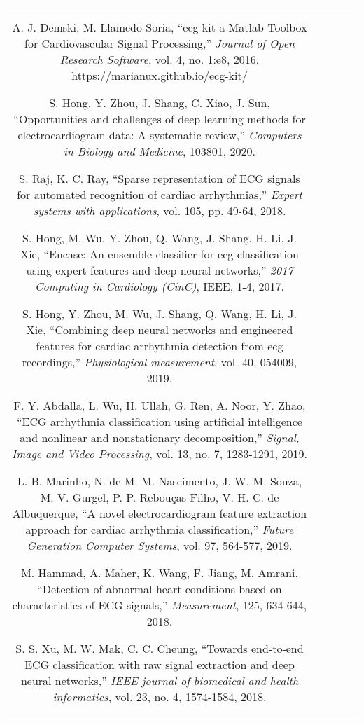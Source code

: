 \documentclass[submitted]{ieeeaccess}
\newcommand{\NewCorrection}[1]{{#1}}
\begin{document}
\begin{table}
\begin{tabular}{|c|c|c|c|c|}
\begin{thebibliography}{99}
	\bibitem{ECGKit}
    A. J. Demski, M. Llamedo Soria, 
    ``ecg-kit a Matlab Toolbox for Cardiovascular Signal Processing,'' 
    \emph{Journal of Open Research Software}, vol. 4, no. 1:e8, 2016. https://marianux.github.io/ecg-kit/

	
    \bibitem{Hong2020}
	\NewCorrection{S. Hong, Y. Zhou, J. Shang, C. Xiao, J. Sun, ``Opportunities and challenges of deep learning methods for electrocardiogram data: A systematic review,'' \emph{Computers in Biology and Medicine}, 103801, 2020.}
	
	\bibitem{RajRay2018}
	\NewCorrection{S. Raj, K. C. Ray, ``Sparse representation of ECG signals for automated recognition of cardiac arrhythmias,'' \emph{Expert systems with applications}, vol. 105, pp. 49-64, 2018.}

	\bibitem{Hong2017}
	\NewCorrection{S. Hong, M. Wu, Y. Zhou, Q.  Wang, J. Shang, H. Li, J. Xie, 
	``Encase: An ensemble classifier for ecg classification using
	expert features and deep neural networks,'' \emph{2017 Computing in
	Cardiology (CinC)}, IEEE, 1-4, 2017.}
	
	\bibitem{Hong2019}
	\NewCorrection{S. Hong, Y. Zhou, M. Wu, J. Shang, Q. Wang, H. Li, J. Xie, 
	``Combining deep neural networks and engineered features
	for cardiac arrhythmia detection from ecg recordings,'' \emph{Physiological
	measurement}, vol. 40, 054009, 2019.}
	
	\bibitem{Abdalla2019}
	\NewCorrection{F. Y. Abdalla, L. Wu, H. Ullah, G. Ren, A. Noor, Y. Zhao, ``ECG arrhythmia classification using artificial intelligence and nonlinear and nonstationary decomposition,'' \emph{Signal, Image and Video Processing}, vol. 13, no. 7, 1283-1291, 2019.}

	\bibitem{Marinho2019}
	\NewCorrection{L. B. Marinho, N. de M. M. Nascimento, J. W. M. Souza, M. V. Gurgel, P. P. Rebouças Filho, V. H. C. de Albuquerque, ``A novel electrocardiogram feature extraction approach for cardiac arrhythmia classification,'' \emph{Future Generation Computer Systems}, vol. 97, 564-577, 2019.}
	
	\bibitem{Hammad2018}
	\NewCorrection{M. Hammad, A. Maher, K. Wang, F. Jiang, M. Amrani, ``Detection of abnormal heart conditions based on characteristics of ECG signals,'' \emph{Measurement}, 125, 634-644, 2018.}
	
	
	\bibitem{Xu2018}
	\NewCorrection{S. S. Xu, M. W. Mak, C. C. Cheung, ``Towards end-to-end ECG classification with raw signal extraction and deep neural networks,'' \emph{IEEE journal of biomedical and health informatics}, vol. 23, no. 4, 1574-1584, 2018.}
	

\end{thebibliography}
\end{tabular}
\end{table}
\end{document}
